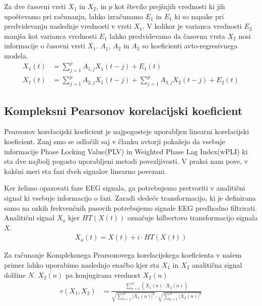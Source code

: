 Za dve časovni vrsti $X_1$ in $X_2$, in $p$ kot število prejšnjih vrednosti ki jih upoštevamo pri računanju, lahko izračunamo $E_1$ in $E_1$ ki so napake pri predvidevanju naslednje vrednosti v vrsti $X_1$. V kolikor je varianca vrednosti $E_2$ manjša kot varianca vrednosti $E_1$ lahko predvidevamo da časovna vrsta $X_2$ nosi informacije o časovni vrsti $X_1$. $A_1$, $A_2$ in $A_3$ so koeficienti avto-regresivnega modela. \cite{sethGrangerCausality2007}
\begin{align*}
X_1(t) &= \sum_{j=1}^{p} A_{1,j} X_1(t-j) + E_1(t)\\
X_1(t) &= \sum_{j=1}^{p} A_{2,j} X_1(t-j) + \sum_{j=1}^{p} A_{3,j} X_2(t-j) + E_2(t)
\end{align*}


\subsection{Kompleksni Pearsonov korelacijski koeficient}
Pearsonov korelacijski koeficient je najpogosteje uporabljen linearni korelacijski koeficient. Zanj smo se odločili saj v članku  
avtorji pokažejo da vsebuje informacije Phase Locking Value(PLV) in Weighted Phase Lag Index(wPLI) ki sta dve najbolj pogosto uporabljeni metodi povezljivosti. V praksi nam pove, v kakšni meri sta fazi dveh signalov linearno povezani.\cite{sverkoComplexPearsonCorrelation2022} 

Ker želimo opazovati faze EEG signala, ga potrebujemo pretvoriti v analitični signal ki vsebuje informacijo o fazi. Zaradi sledeče transformacijo, ki je definirana samo na ozkih frekvenčnih pasovih potrebujemo signale EEG predhodno filtrirati. Analitični signal $X_a$ kjer $HT(X(t))$ označuje hilbertovo transformacijo signala $X$.\cite{sverkoComplexPearsonCorrelation2022} 
\begin{align*}
    X_a(t) = X(t) + i \cdot HT(X(t))
\end{align*}

Za računanje Kompleksnega Pearsonovega korelacijskega koeficienta v našem primer lahko uporabimo naslednjo enačbo kjer sta $X_1$ in $X_2$ analitična signal dolžine $N$. $\overline{X_2(n)}$ pa konjugirana vrednost $X_2(n)$\cite{sverkoComplexPearsonCorrelation2022} 
\begin{align*}
r(X_1, X_2) &= \frac{\sum\limits_{n=1}^{N}(X_1(n) \cdot \overline{X_2(n)})}{\sqrt{\sum\limits_{n=1}^{N} |X_1(n)|^2} \cdot \sqrt{\sum\limits_{n=1}^{N} |X_2(n)|^2}}
\end{align*}

